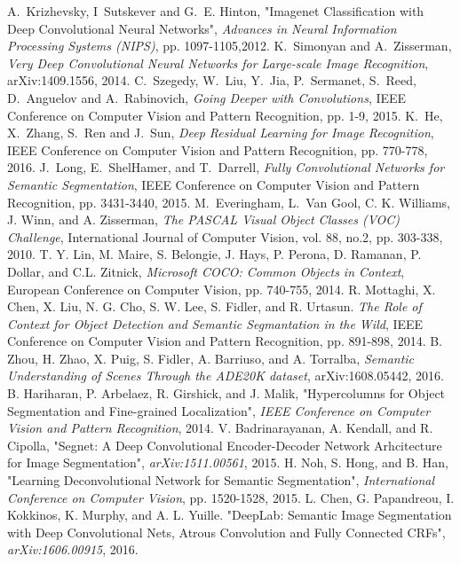 \documentclass[a4paper,conference]{IEEEtran}
\begin{document}
\begin{thebibliography}{1}

A.~Krizhevsky, I~Sutskever and G.~E. Hinton, "Imagenet Classification with Deep Convolutional Neural Networks", \emph{Advances in Neural Information Processing Systems (NIPS)}, pp. 1097-1105,2012.
K.~Simonyan and A.~Zisserman, \emph{Very Deep Convolutional Neural Networks for Large-scale Image Recognition}, arXiv:1409.1556, 2014.
C.~Szegedy, W.~Liu, Y.~Jia, P.~Sermanet, S.~Reed, D.~Anguelov and A.~Rabinovich, \emph{Going Deeper with Convolutions}, IEEE Conference on Computer Vision and Pattern Recognition, pp. 1-9, 2015.
K.~He, X.~Zhang, S.~Ren and J.~Sun, \emph{Deep Residual Learning for Image Recognition}, IEEE Conference on Computer Vision and Pattern Recognition, pp. 770-778, 2016.
J.~Long, E.~ShelHamer, and T.~Darrell, \emph{Fully Convolutional Networks for Semantic Segmentation}, IEEE Conference on Computer Vision and Pattern Recognition, pp. 3431-3440, 2015.
M.~Everingham, L.~Van Gool, C. K. Williams, J. Winn, and A. Zisserman, \emph{The PASCAL Visual Object Classes (VOC) Challenge}, International Journal of Computer Vision, vol. 88, no.2, pp. 303-338, 2010.
T. Y. Lin, M. Maire, S. Belongie, J. Hays, P. Perona, D. Ramanan, P. Dollar, and C.L. Zitnick, \emph{Microsoft COCO: Common Objects in Context}, European Conference on Computer Vision, pp. 740-755, 2014.
R. Mottaghi, X. Chen, X. Liu, N. G. Cho, S. W. Lee, S. Fidler, and R. Urtasun. \emph{The Role of Context for Object Detection and Semantic Segmantation in the Wild}, IEEE Conference on Computer Vision and Pattern Recognition, pp. 891-898, 2014.
B. Zhou, H. Zhao, X. Puig, S. Fidler, A. Barriuso, and A. Torralba, \emph{Semantic Understanding of Scenes Through the ADE20K dataset}, arXiv:1608.05442, 2016.
B. Hariharan, P. Arbelaez, R. Girshick, and J. Malik, "Hypercolumns for Object Segmentation and Fine-grained Localization", \emph{IEEE Conference on Computer Vision and Pattern Recognition}, 2014.
V. Badrinarayanan, A. Kendall, and R. Cipolla, "Segnet: A Deep Convolutional Encoder-Decoder Network Arhcitecture for Image Segmentation", \emph{arXiv:1511.00561}, 2015.
H. Noh, S. Hong, and B. Han, "Learning Deconvolutional Network for Semantic Segmentation", \emph{International Conference on Computer Vision}, pp. 1520-1528, 2015.
L. Chen, G. Papandreou, I. Kokkinos, K. Murphy, and A. L. Yuille. "DeepLab: Semantic Image Segmentation with Deep Convolutional Nets, Atrous Convolution and Fully Connected CRFs", \emph{arXiv:1606.00915}, 2016.

\end{thebibliography}
\end{document}
